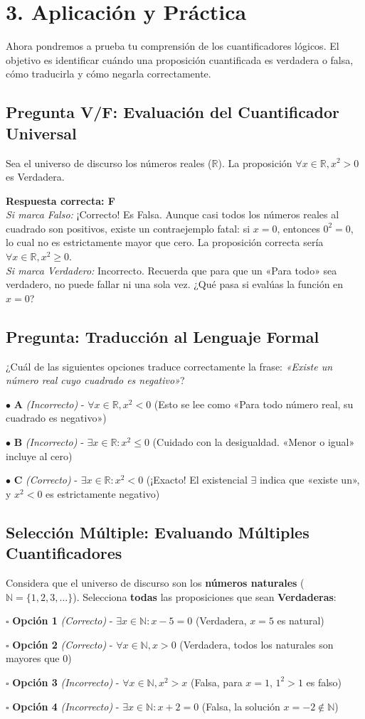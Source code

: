 \documentclass[11pt]{article}
\newenvironment{aplicacion}{\section*{3. Aplicación y Práctica}}{}
\newenvironment{preguntaalternativas}[1]{\subsection*{Pregunta: #1}\par\vspace{0.1cm}}{\vspace{0.3cm}}
\newcommand{\opcion}[3]{\par\noindent $\bullet$ \textbf{#1} \textit{(#2)} - #3\par\vspace{0.15cm}}
\newenvironment{preguntaverdaderofalso}[1]{\subsection*{Pregunta V/F: #1}\par\vspace{0.1cm}}{\vspace{0.3cm}}
\newcommand{\verdaderofalso}[3]{\par\noindent\textbf{Respuesta correcta: #1} \\ \textit{Si marca Falso:} #2 \\ \textit{Si marca Verdadero:} #3\par\vspace{0.15cm}}
\newenvironment{preguntacasillas}[1]{\subsection*{Selección Múltiple: #1}\par\vspace{0.1cm}}{\vspace{0.3cm}}
\newcommand{\casilla}[3]{\par\noindent $\square$ \textbf{#1} \textit{(#2)} - #3\par\vspace{0.15cm}}
\begin{document}
\begin{aplicacion}
  Ahora pondremos a prueba tu comprensión de los cuantificadores lógicos. El objetivo es identificar cuándo una proposición cuantificada es verdadera o falsa, cómo traducirla y cómo negarla correctamente.

  \begin{preguntaverdaderofalso}{Evaluación del Cuantificador Universal}
    Sea el universo de discurso los números reales ($\mathbb{R}$). La proposición $\forall x \in \mathbb{R}, x^2 > 0$ es Verdadera.
    \verdaderofalso{F}
      {¡Correcto! Es Falsa. Aunque casi todos los números reales al cuadrado son positivos, existe un contraejemplo fatal: si $x = 0$, entonces $0^2 = 0$, lo cual no es estrictamente mayor que cero. La proposición correcta sería $\forall x \in \mathbb{R}, x^2 \geq 0$.}
      {Incorrecto. Recuerda que para que un «Para todo» sea verdadero, no puede fallar ni una sola vez. ¿Qué pasa si evalúas la función en $x = 0$?}
  \end{preguntaverdaderofalso}

  \begin{preguntaalternativas}{Traducción al Lenguaje Formal}
    ¿Cuál de las siguientes opciones traduce correctamente la frase: \textit{«Existe un número real cuyo cuadrado es negativo»}?
    
    \opcion{A}{Incorrecto}{$\forall x \in \mathbb{R}, x^2 < 0$ (Esto se lee como «Para todo número real, su cuadrado es negativo»)}
    \opcion{B}{Incorrecto}{$\exists x \in \mathbb{R} : x^2 \leq 0$ (Cuidado con la desigualdad. «Menor o igual» incluye al cero)}
    \opcion{C}{Correcto}{$\exists x \in \mathbb{R} : x^2 < 0$ (¡Exacto! El existencial $\exists$ indica que «existe un», y $x^2 < 0$ es estrictamente negativo)}
  \end{preguntaalternativas}

  \begin{preguntacasillas}{Evaluando Múltiples Cuantificadores}
    Considera que el universo de discurso son los \textbf{números naturales} ($\mathbb{N} = \{1, 2, 3, \dots\}$). Selecciona \textbf{todas} las proposiciones que sean \textbf{Verdaderas}:
    
    \casilla{Opción 1}{Correcto}{$\exists x \in \mathbb{N} : x - 5 = 0$ (Verdadera, $x=5$ es natural)}
    \casilla{Opción 2}{Correcto}{$\forall x \in \mathbb{N}, x > 0$ (Verdadera, todos los naturales son mayores que 0)}
    \casilla{Opción 3}{Incorrecto}{$\forall x \in \mathbb{N}, x^2 > x$ (Falsa, para $x=1$, $1^2 > 1$ es falso)}
    \casilla{Opción 4}{Incorrecto}{$\exists x \in \mathbb{N} : x + 2 = 0$ (Falsa, la solución $x=-2 \notin \mathbb{N}$)}
  \end{preguntacasillas}


\end{aplicacion}
\end{document}
